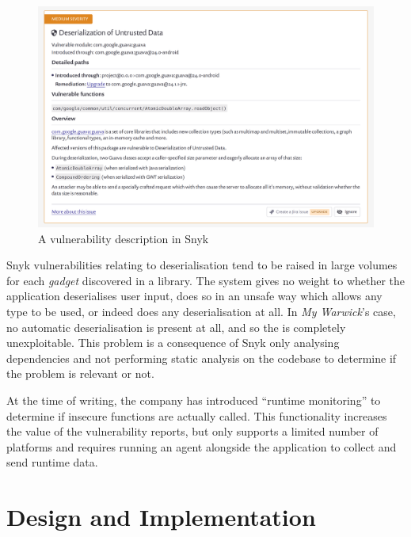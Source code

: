 \documentclass[a4paper,openany,12pt]{book}
\begin{document}
\begin{figure}[H]
    \begin{MyMdframed}
        \vspace{0.5em}
        
        
        \caption{\label{figure:snyk}A vulnerability description in Snyk}
        \vspace{0.5em}
        \captionsetup{style=default}

        \centering \includegraphics[width=0.9\linewidth]{snyk.png}
    \end{MyMdframed}
\end{figure}

Snyk vulnerabilities relating to deserialisation tend to be raised in large volumes for each \emph{gadget} discovered in
a library.
The system gives no weight to whether the application deserialises user input, does so in an unsafe way which allows any
type to be used, or indeed does any deserialisation at all.
In \emph{My Warwick}'s case, no automatic deserialisation is present at all, and so the is completely unexploitable.
This problem is a consequence of Snyk only analysing dependencies and not performing static analysis on the codebase to
determine if the problem is relevant or not.

At the time of writing, the company has introduced ``runtime monitoring'' to determine if insecure functions are
actually called.
This functionality increases the value of the vulnerability reports, but only supports a limited number of platforms and
requires running an agent alongside the application to collect and send runtime data.

\chapter{Design and Implementation}
\end{document}
